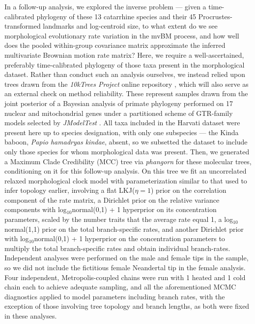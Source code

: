 \documentclass[10pt, twocolumn, twoside]{article}
\begin{document}
In a follow-up analysis, we explored the inverse problem --- given a time-calibrated phylogeny of these 13 catarrhine species and their 45 Procrustes-transformed landmarks and log-centroid size, to what extent do we see morphological evolutionary rate variation in the mvBM process, and how well does the pooled within-group covariance matrix approximate the inferred multivariate Brownian motion rate matrix? Here, we require a well-ascertained, preferably time-calibrated phylogeny of those taxa present in the morphological dataset. Rather than conduct such an analysis ourselves, we instead relied upon trees drawn from the \emph{10kTrees Project} online repository \citep{arnold10kTreesWebsiteNew2010}, which will also serve as an external check on method reliability. These represent samples drawn from the joint posterior of a Bayesian analysis of primate phylogeny performed on 17 nuclear and mitochondrial genes under a partitioned scheme of GTR-family models selected by \emph{JModelTest} \citep{posadaJModelTestPhylogeneticModel2008}. All taxa included in the Harvati dataset were present here up to species designation, with only one subspecies --- the Kinda baboon, \emph{Papio hamadryas kindae}, absent, so we subsetted the dataset to include only those species for whom morphological data was present. Then, we generated a Maximum Clade Credibility (MCC) tree via \textit{phangorn} \citep{schliepPhangornPhylogeneticAnalysis2011} for these molecular trees, conditioning on it for this follow-up analysis. On this tree we fit an uncorrelated relaxed morphological clock model with parameterization similar to that used to infer topology earlier, involving a flat LKJ($\eta = 1$) prior on the correlation component of the rate matrix, a Dirichlet prior on the relative variance components with log$_{10}$normal(0,1) + 1 hyperprior on its concentration parameters, scaled by the number traits that the average rate equal 1, a log$_{10}$normal(1,1) prior on the total branch-specific rates, and another Dirichlet prior with log$_{10}$normal(0,1) + 1 hyperprior on the concentration parameters to multiply the total branch-specific rates and obtain individual branch-rates. Independent analyses were performed on the male and female tips in the sample, so we did not include the fictitious female Neandertal tip in the female analysis. Four independent, Metropolis-coupled chains were run with 1 heated and 1 cold chain each to achieve adequate sampling, and all the aforementioned MCMC diagnostics applied to model parameters including branch rates, with the exception of those involving tree topology and branch lengths, as both were fixed in these analyses. 
\end{document}
